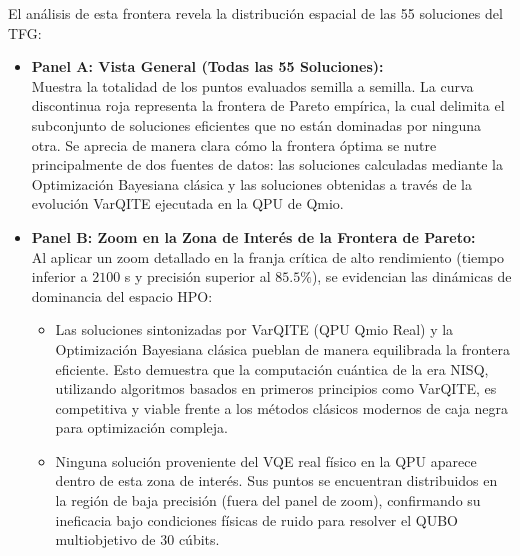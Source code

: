 El análisis de esta frontera revela la distribución espacial de las 55 soluciones del TFG:
\begin{itemize}
    \item \textbf{Panel A: Vista General (Todas las 55 Soluciones):} \\
    Muestra la totalidad de los puntos evaluados semilla a semilla. La curva discontinua roja representa la frontera de Pareto empírica, la cual delimita el subconjunto de soluciones eficientes que no están dominadas por ninguna otra. Se aprecia de manera clara cómo la frontera óptima se nutre principalmente de dos fuentes de datos: las soluciones calculadas mediante la Optimización Bayesiana clásica y las soluciones obtenidas a través de la evolución VarQITE ejecutada en la QPU de Qmio.
    
    \item \textbf{Panel B: Zoom en la Zona de Interés de la Frontera de Pareto:} \\
    Al aplicar un zoom detallado en la franja crítica de alto rendimiento (tiempo inferior a $2100$ s y precisión superior al $85.5\%$), se evidencian las dinámicas de dominancia del espacio HPO:
    \begin{itemize}
        \item Las soluciones sintonizadas por VarQITE (QPU Qmio Real) y la Optimización Bayesiana clásica pueblan de manera equilibrada la frontera eficiente. Esto demuestra que la computación cuántica de la era NISQ, utilizando algoritmos basados en primeros principios como VarQITE, es competitiva y viable frente a los métodos clásicos modernos de caja negra para optimización compleja.
        \item Ninguna solución proveniente del VQE real físico en la QPU aparece dentro de esta zona de interés. Sus puntos se encuentran distribuidos en la región de baja precisión (fuera del panel de zoom), confirmando su ineficacia bajo condiciones físicas de ruido para resolver el QUBO multiobjetivo de 30 cúbits.
    \end{itemize}
\end{itemize}
